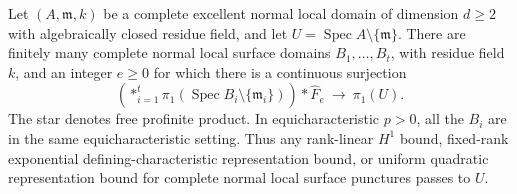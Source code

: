 \begin{proposition}
\label{D:local-surface-reduction}
Let $(A,\mathfrak m,k)$ be a complete excellent normal local domain of
dimension $d\ge2$ with algebraically closed residue field, and let
$U=\operatorname{Spec}A\setminus\{\mathfrak m\}$. There are finitely
many complete normal local surface domains $B_1,\ldots,B_t$, with residue
field $k$, and an integer $e\ge0$ for which there is a continuous
surjection
\[
 \left(\mathop{\ast}_{i=1}^t
 \pi_1(\operatorname{Spec}B_i\setminus\{\mathfrak m_i\})\right)
 \ast\widehat F_e\ \longrightarrow\ \pi_1(U).
\]
The star denotes free profinite product. In equicharacteristic $p>0$,
all the $B_i$ are in the same equicharacteristic setting. Thus any
rank-linear $H^1$ bound, fixed-rank exponential defining-characteristic
representation bound, or uniform quadratic representation bound for
complete normal local surface punctures passes to $U$.
\end{proposition}
